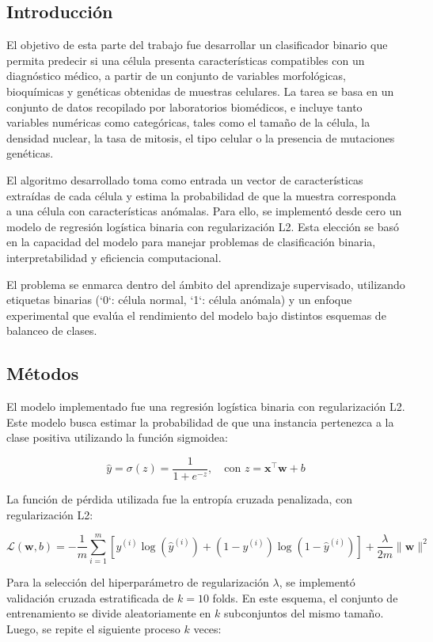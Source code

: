 \documentclass[11pt]{article}
\begin{document}
\subsection{Introducción}
El objetivo de esta parte del trabajo fue desarrollar un clasificador binario que permita predecir si una célula presenta características compatibles con un diagnóstico médico, a partir de un conjunto de variables morfológicas, bioquímicas y genéticas obtenidas de muestras celulares. La tarea se basa en un conjunto de datos recopilado por laboratorios biomédicos, e incluye tanto variables numéricas como categóricas, tales como el tamaño de la célula, la densidad nuclear, la tasa de mitosis, el tipo celular o la presencia de mutaciones genéticas.

El algoritmo desarrollado toma como entrada un vector de características extraídas de cada célula y estima la probabilidad de que la muestra corresponda a una célula con características anómalas. Para ello, se implementó desde cero un modelo de regresión logística binaria con regularización L2. Esta elección se basó en la capacidad del modelo para manejar problemas de clasificación binaria, interpretabilidad y eficiencia computacional.

El problema se enmarca dentro del ámbito del aprendizaje supervisado, utilizando etiquetas binarias (`0`: célula normal, `1`: célula anómala) y un enfoque experimental que evalúa el rendimiento del modelo bajo distintos esquemas de balanceo de clases.


\subsection{Métodos}

El modelo implementado fue una regresión logística binaria con regularización L2. Este modelo busca estimar la probabilidad de que una instancia pertenezca a la clase positiva utilizando la función sigmoidea:

\[
\hat{y} = \sigma(z) = \frac{1}{1 + e^{-z}}, \quad \text{con } z = \mathbf{x}^\top \mathbf{w} + b
\]

La función de pérdida utilizada fue la entropía cruzada penalizada, con regularización L2:

\[
\mathcal{L}(\mathbf{w}, b) = -\frac{1}{m} \sum_{i=1}^{m} \left[ y^{(i)} \log(\hat{y}^{(i)}) + (1 - y^{(i)}) \log(1 - \hat{y}^{(i)}) \right] + \frac{\lambda}{2m} \|\mathbf{w}\|^2
\]

Para la selección del hiperparámetro de regularización $\lambda$, se implementó validación cruzada estratificada de $k=10$ folds. En este esquema, el conjunto de entrenamiento se divide aleatoriamente en $k$ subconjuntos del mismo tamaño. Luego, se repite el siguiente proceso $k$ veces:
\end{document}
